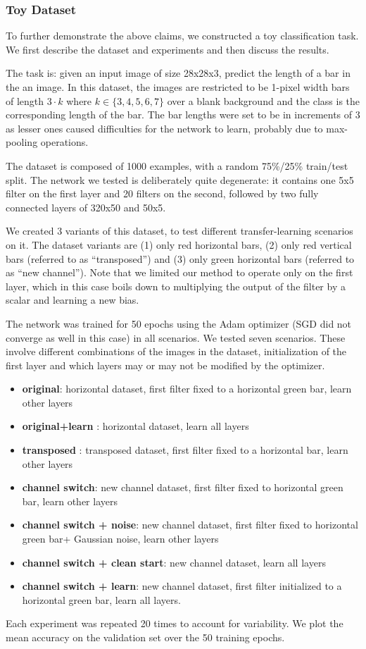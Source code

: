 \documentclass[10pt,journal,compsoc]{IEEEtran}
\begin{document}
\subsubsection{Toy Dataset }

To further demonstrate the above claims, we constructed a toy classification
task. We first describe the dataset and experiments and then discuss
the results.

The task is: given an input image of size 28x28x3, predict the length
of a bar in the an image. In this dataset, the images are restricted
to be 1-pixel width bars of length $3\cdot k$ where $k\in\{3,4,5,6,7\}$
over a blank background and the class is the corresponding length
of the bar. The bar lengths were set to be in increments of 3 as lesser
ones caused difficulties for the network to learn, probably due to
max-pooling operations. 

The dataset is composed of 1000 examples, with a random 75\%/25\%
train/test split. The network we tested is deliberately quite degenerate:
it contains one 5x5 filter on the first layer and 20 filters on the
second, followed by two fully connected layers of 320x50 and 50x5. 

We created 3 variants of this dataset, to test different transfer-learning
scenarios on it. The dataset variants are (1) only red horizontal
bars, (2) only red vertical bars (referred to as ``transposed'')
and (3) only green horizontal bars (referred to as ``new channel'').
Note that we limited our method to operate only on the first layer,
which in this case boils down to multiplying the output of the filter
by a scalar and learning a new bias. 

The network was trained for 50 epochs using the Adam \cite{kingma2014adam}
optimizer (SGD did not converge as well in this case) in all scenarios.
We tested seven scenarios. These involve different combinations of
the images in the dataset, initialization of the first layer and which
layers may or may not be modified by the optimizer. 
\begin{itemize}
\item \textbf{original}: horizontal dataset, first filter fixed to a horizontal
green bar, learn other layers
\item \textbf{original+learn }: horizontal dataset, learn all layers
\item \textbf{transposed} : transposed dataset, first filter fixed to a
horizontal bar, learn other layers
\item \textbf{channel switch}: new channel dataset, first filter fixed to
horizontal green bar, learn other layers
\item \textbf{channel switch + noise}: new channel dataset, first filter
fixed to horizontal green bar+ Gaussian noise, learn other layers
\item \textbf{channel switch + clean start}: new channel dataset, learn
all layers
\item \textbf{channel switch + learn}: new channel dataset, first filter
initialized to a horizontal green bar, learn all layers.
\end{itemize}
Each experiment was repeated 20 times to account for variability.
We plot the mean accuracy on the validation set over the 50 training
epochs. 
\end{document}
